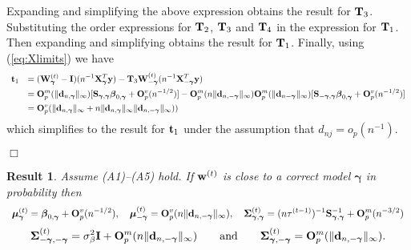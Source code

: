 \documentclass[11pt]{article}
\newtheorem{Result}{Result}
\newtheorem{Main Result}{Main Result}
\def\vectorfontone{\bf}
\def\vectorfonttwo{\boldsymbol}
\def\vd{{\vectorfontone d}}                      %
\def\vt{{\vectorfontone t}}                      %
\def\vw{{\vectorfontone w}}                      %
\def\vy{{\vectorfontone y}}                      %
\def\vbeta{{\vectorfonttwo \beta}}               %
\def\vgamma{{\vectorfonttwo \gamma}}             %
\def\vmu{{\vectorfonttwo \mu}}                   %
\def\matrixfontone{\bf}
\def\matrixfonttwo{\boldsymbol}
\def\mI{{\matrixfontone I}}                      %
\def\mO{{\matrixfontone O}}                      %
\def\mo{{\matrixfontone o}}                      %
\def\mS{{\matrixfontone S}}                      %
\def\mT{{\matrixfontone T}}                      %
\def\mW{{\matrixfontone W}}                      %
\def\mX{{\matrixfontone X}}                      %
\def\mSigma{{\matrixfonttwo \Sigma}}             %
\def\ds{\displaystyle}
\newcommand{\cyc}[1]{{\color{black}#1}}
\begin{document}
\noindent Expanding and simplifying the above expression obtains
the result for $\mT_3$. Substituting the order
expressions for $\mT_2$, $\mT_3$ and $\mT_4$ in the
expression for $\mT_1$. Then expanding and simplifying
obtains the result for $\mT_1$. Finally, using (\ref{eq:Xlimits}) we have
$$
\begin{array}{rl}
\ds \vt_1
& \ds = (\mW_{\vgamma}^{(t)} - \mI)(n^{-1}\mX_{\vgamma}^T\vy)
- \mT_3\mW_{-\vgamma}^{(t)}(n^{-1}\mX_{-\vgamma}^T\vy)
\\ [1ex]
& \ds = \mO_p^m(\|\vd_{n,\vgamma}\|_\infty)[\mS_{\vgamma,\vgamma}\vbeta_{0,\vgamma} + \mO_p^v(n^{-1/2})]
- \mO_p^m(n\|\vd_{n,-\vgamma}\|_\infty)\mO_p^m(\|\vd_{n-\vgamma}\|_\infty)
[\mS_{-\vgamma,\vgamma}\vbeta_{0,\vgamma} + \mO_p^v(n^{-1/2})] \\ [1ex]
& \ds
= \mO_p^v(\|\vd_{n,\vgamma}\|_\infty + n\|\vd_{n,\vgamma}\|_\infty\|\vd_{n,-\vgamma}\|_\infty)
)
\end{array}
$$
\noindent which simplifies to the result for $\vt_1$ under the assumption that
$d_{nj}=o_p(n^{-1})$.
\vspace{-0.5cm}\begin{flushright}$\Box$\end{flushright}



\begin{Result}\label{res:8}
	Assume (A1)--(A5) hold. If $\vw^{(t)}$ is close to a correct model $\vgamma$ in probability then
	$$
	\begin{array}{c}
	\ds \vmu_{\vgamma}^{(t)}  = \vbeta_{0,\vgamma} + \mO_p^v(n^{-1/2}),
	\quad
	\vmu_{-\vgamma}^{(t)} = \mO_p^v(n\|\vd_{n,-\vgamma}\|_\infty),\quad \cyc{\mSigma_{\vgamma,\vgamma}^{(t)}=
		(n{\tau^{(t-1)}})^{-1}\mS_{\vgamma,\vgamma}^{-1} + \mO_p^m(n^{-3/2})
	}
	\end{array}
	$$
	$$
	\mSigma_{-\vgamma,-\vgamma}^{(t)}  = \sigma_\beta^2\mI + \mO_p^m(n\|\vd_{n,-\vgamma}\|_\infty)\qquad \mbox{and}\qquad
	\mSigma_{\vgamma,-\vgamma}^{(t)}  = \mO_p^m(\|\vd_{n,-\vgamma}\|_\infty).
	$$
\end{Result}
\end{document}
